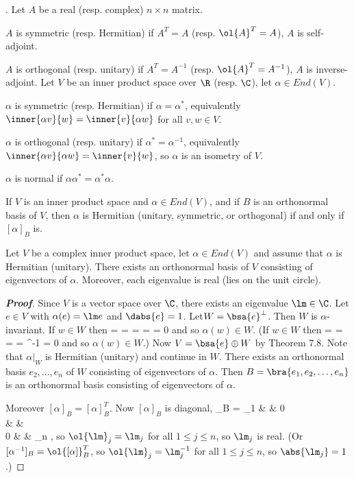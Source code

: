 \begin{definition}. Let $A$ be a real (resp. complex) $n \times n$ matrix.
\bit
\item $A$ is symmetric (resp. Hermitian) if $A^T = A$ (resp. $\ol{A}^T = A$), $A$ is self-adjoint.
\item $A$ is orthogonal (resp. unitary) if $A^T = A^{-1}$ (resp. $\ol{A}^T = A^{-1}$), $A$ is inverse-adjoint.
\eit
Let $V$ be an inner product space over $\R$ (resp. $\C$), let $\alpha \in End(V )$.
\bit
\item $\alpha$ is symmetric (resp. Hermitian) if $\alpha = \alpha^*$, equivalently $\inner{\alpha v}{w} = \inner{v}{\alpha w}$ for all $v,w \in V$.
\item $\alpha$ is orthogonal (resp. unitary) if $\alpha^* = \alpha^{-1}$, equivalently $\inner{\alpha v}{\alpha w} = \inner{v}{w}$, so $\alpha$ is an isometry of $V$.
\item $\alpha$ is normal if $\alpha\alpha^* = \alpha^*\alpha$.
\eit
\end{definition}

\begin{lemma}
If $V$ is an inner product space and $\alpha \in End(V)$, and if $B$ is an orthonormal basis of $V$, then $\alpha$ is Hermitian (unitary, symmetric, or orthogonal) if and only if $[\alpha]_B$ is.
\end{lemma}

\begin{theorem}
Let $V$ be a complex inner product space, let $\alpha \in End(V)$ and assume that $\alpha$ is Hermitian (unitary). There exists an orthonormal basis of $V$ consisting of eigenvectors of $\alpha$. Moreover, each eigenvalue is real (lies on the unit circle).
\end{theorem}

\begin{proof}[\bf Proof]
Since $V$ is a vector space over $\C$, there exists an eigenvalue $\lm \in\C$. Let $e \in V$ with $\alpha(e) = \lm e$ and $\dabs{e} = 1$. Let$ W = \bsa{e}^\perp$. Then $W$ is $\alpha$-invariant. If $w \in W$ then 
\be
{} =  =  =  = \lm {} = 0
\ee
and so $\alpha(w) \in W$. (If $w \in W$ then
\be
{} =  =  =  = \lm^{-1} = 0
\ee
and so $\alpha(w) \in W$.) Now $V = \bsa{e} \oplus W$ by Theorem 7.8. Note that $\alpha|_W$ is Hermitian (unitary) and continue in $W$. There exists an orthonormal basis $e_2, \dots, e_n$ of $W$ consisting of eigenvectors of $\alpha$. Then $B = \bra{e_1, e_2, \dots, e_n}$ is an orthonormal basis consisting of eigenvectors of $\alpha$.

Moreover $[\alpha]_B = [\alpha]^T_B$. Now $[\alpha]_B$ is diagonal,
\be
[\alpha]_B = \bepm
\lm_1 & & 0\\
& \ddots & \\
0 & & \lm_n
\eepm,
\ee
so $\ol{\lm}_j = \lm_j$ for all $1 \leq  j \leq  n$, so $\lm_j$ is real. (Or $[\alpha^{-1}]_B = \ol{[\alpha]}^T_B$, so $\ol{\lm}_j = \lm^{-1}_j$ for all $1 \leq  j \leq  n$, so $\abs{\lm_j} = 1$.)
\end{proof}


